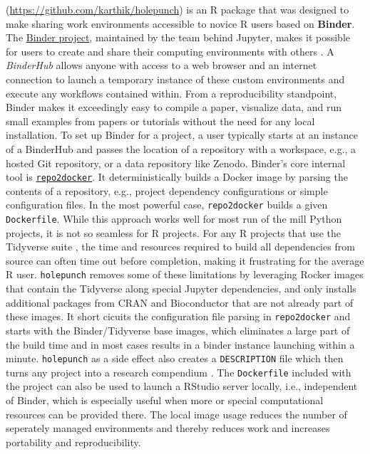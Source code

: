 \textbf{} (\url{https://github.com/karthik/holepunch}) is
an R package that was designed to make sharing work environments
accessible to novice R users based on \textbf{Binder}. The
\href{https://mybinder.readthedocs.io/en/latest/}{Binder project},
maintained by the team behind Jupyter, makes it possible for users to
create and share their computing environments with others
\citep{jupyter_binder_2018}. A \emph{BinderHub} allows anyone with
access to a web browser and an internet connection to launch a temporary
instance of these custom environments and execute any workflows
contained within. From a reproducibility standpoint, Binder makes it
exceedingly easy to compile a paper, visualize data, and run small
examples from papers or tutorials without the need for any local
installation. To set up Binder for a project, a user typically starts at
an instance of a BinderHub and passes the location of a repository with
a workspace, e.g., a hosted Git repository, or a data repository like
Zenodo. Binder's core internal tool is
\href{https://repo2docker.readthedocs.io/en/latest/config_files.html}{\texttt{repo2docker}}.
It deterministically builds a Docker image by parsing the contents of a
repository, e.g., project dependency configurations or simple
configuration files. In the most powerful case, \texttt{repo2docker}
builds a given \texttt{Dockerfile}. While this approach works well for
most run of the mill Python projects, it is not so seamless for R
projects. For any R projects that use the Tidyverse suite
\citep{wickham_welcome_2019}, the time and resources required to build
all dependencies from source can often time out before completion,
making it frustrating for the average R user. \texttt{holepunch} removes
some of these limitations by leveraging Rocker images that contain the
Tidyverse along special Jupyter dependencies, and only installs
additional packages from CRAN and Bioconductor that are not already part
of these images. It short cicuits the configuration file parsing in
\texttt{repo2docker} and starts with the Binder/Tidyverse base images,
which eliminates a large part of the build time and in most cases
results in a binder instance launching within a minute.
\texttt{holepunch} as a side effect also creates a \texttt{DESCRIPTION}
file which then turns any project into a research compendium
\citep{marwick_packaging_2018}. The \texttt{Dockerfile} included with
the project can also be used to launch a RStudio server locally, i.e.,
independent of Binder, which is especially useful when more or special
computational resources can be provided there. The local image usage
reduces the number of seperately managed environments and thereby
reduces work and increases portability and reproducibility.

